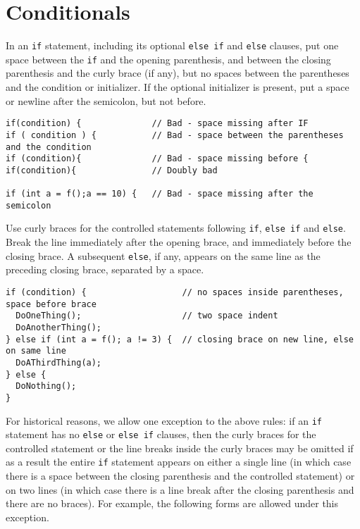 
\section{Conditionals}\label{sec:conditionals}
In an \texttt{if} statement, including its optional \texttt{else if} and \texttt{else} clauses, put one space between the \texttt{if} and the opening parenthesis, and between the closing parenthesis and the curly brace (if any), but no spaces between the parentheses and the condition or initializer. If the optional initializer is present, put a space or newline after the semicolon, but not before.

\begin{verbatim}
if(condition) {              // Bad - space missing after IF
if ( condition ) {           // Bad - space between the parentheses and the condition
if (condition){              // Bad - space missing before {
if(condition){               // Doubly bad

if (int a = f();a == 10) {   // Bad - space missing after the semicolon
\end{verbatim}
Use curly braces for the controlled statements following \texttt{if}, \texttt{else if} and \texttt{else}. Break the line immediately after the opening brace, and immediately before the closing brace. A subsequent \texttt{else}, if any, appears on the same line as the preceding closing brace, separated by a space.

\begin{verbatim}
if (condition) {                   // no spaces inside parentheses, space before brace
  DoOneThing();                    // two space indent
  DoAnotherThing();
} else if (int a = f(); a != 3) {  // closing brace on new line, else on same line
  DoAThirdThing(a);
} else {
  DoNothing();
}
\end{verbatim}

For historical reasons, we allow one exception to the above rules: if an \texttt{if} statement has no \texttt{else} or \texttt{else if} clauses, then the curly braces for the controlled statement or the line breaks inside the curly braces may be omitted if as a result the entire \texttt{if} statement appears on either a single line (in which case there is a space between the closing parenthesis and the controlled statement) or on two lines (in which case there is a line break after the closing parenthesis and there are no braces). For example, the following forms are allowed under this exception.

